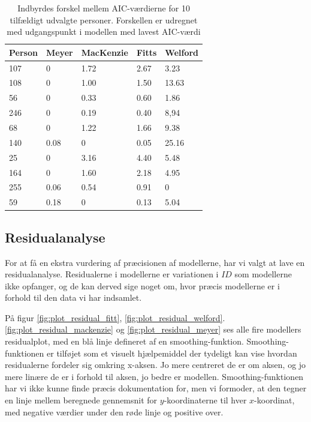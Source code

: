 \begin{table}[h]
\centering
\begin{tabular}{lllll}
Person & Meyer  & MacKenzie & Fitts  & Welford \\\hline
107    & 0      & 1.72      & 2.67   & 3.23    \\
108    & 0      & 1.00      & 1.50   & 13.63   \\
56     & 0      & 0.33      & 0.60   & 1.86    \\
246    & 0      & 0.19      & 0.40   & 8,94    \\
68     & 0      & 1.22      & 1.66   & 9.38    \\
140    & 0.08   & 0         & 0.05   & 25.16   \\
25     & 0      & 3.16      & 4.40   & 5.48    \\
164    & 0      & 1.60      & 2.18   & 4.95    \\
255    & 0.06   & 0.54      & 0.91   & 0       \\
59     & 0.18   & 0         & 0.13   & 5.04
\end{tabular}
\caption{Indbyrdes forskel mellem AIC-værdierne for 10 tilfældigt udvalgte personer. Forskellen er udregnet med udgangspunkt i modellen med lavest AIC-værdi}
\label{tab:table_analysis_aic3}
\end{table}

\subsection*{Residualanalyse}
For at få en ekstra vurdering af præcisionen af modellerne, har vi valgt at lave en residualanalyse. Residualerne i modellerne er variationen i $ID$ som modellerne ikke opfanger, og de kan derved sige noget om, hvor præcis modellerne er i forhold til den data vi har indsamlet.

På figur \ref{fig:plot_residual_fitt}, \ref{fig:plot_residual_welford}. \ref{fig:plot_residual_mackenzie} og \ref{fig:plot_residual_meyer} ses alle fire modellers residualplot, med en blå linje defineret af en smoothing-funktion. Smoothing-funktionen er tilføjet som et visuelt hjælpemiddel der tydeligt kan vise hvordan residualerne fordeler sig omkring x-aksen. Jo mere centreret de er om aksen, og jo mere linære de er i forhold til aksen, jo bedre er modellen. Smoothing-funktionen har vi ikke kunne finde præcis dokumentation for, men vi formoder, at den tegner en linje mellem beregnede gennemsnit for $y$-koordinaterne til hver $x$-koordinat, med negative værdier under den røde linje og positive over.

